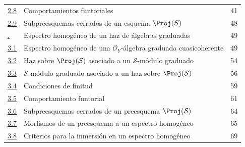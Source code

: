 \documentclass[oneside,10pt]{amsart}
\newcommand{\oldpage}[2][]{\marginnote{\normalfont\footnotesize\textbf{#1}~|~#2}\ignorespaces}
\begin{document}
\begin{longtable}{@{}p{}p{}r@{}}
\hyperref[subsection:II.2.8-fr]{2.8} & Comportamientos funtoriales & 41\\
\hyperref[subsection:II.2.9-fr]{2.9} & Subpreesquemas cerrados de un esquema $\Proj(S)$ & 48\\
\hyperref[section:II.3-fr]{\textsection3.} & Espectro homogéneo de un haz de álgebras graduadas & 49\\
\hyperref[subsection:II.3.1-fr]{3.1} & Espectro homogéneo de una $\mathcal{O}_Y$-álgebra graduada cuasicoherente & 49\\
\hyperref[subsection:II.3.2-fr]{3.2} & Haz sobre $\Proj(\mathcal{S})$ asociado a un $\mathcal{S}$-módulo graduado & 54\\
\hyperref[subsection:II.3.3-fr]{3.3} & $\mathcal{S}$-módulo graduado asociado a un haz sobre $\Proj(\mathcal{S})$ & 56\\
\hyperref[subsection:II.3.4-fr]{3.4} & Condiciones de finitud & 59\\
\hyperref[subsection:II.3.5-fr]{3.5} & Comportamiento funtorial & 61\\
\hyperref[subsection:II.3.6-fr]{3.6} & Subpreesquemas cerrados de un preesquema $\Proj(\mathcal{S})$ & 64\\
\hyperref[subsection:II.3.7-fr]{3.7} & Morfismos de un preesquema a un espectro homogéneo & 65\\
\hyperref[subsection:II.3.8-fr]{3.8} & Criterios para la inmersión en un espectro homogéneo & 69\\
\end{longtable}
\oldpage[II]{214}
\end{document}
